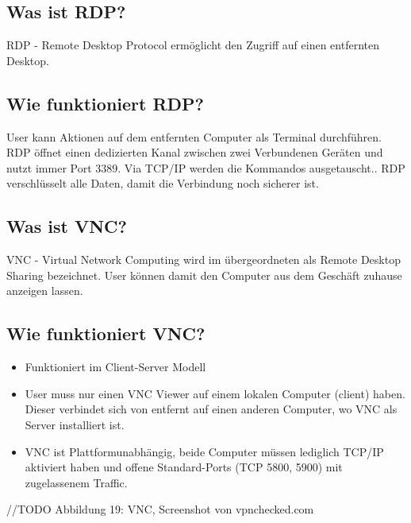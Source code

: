 \subsection*{Was ist RDP?}
RDP - Remote Desktop Protocol ermöglicht den Zugriff auf einen entfernten Desktop.

\subsection*{Wie funktioniert RDP?}
User kann Aktionen auf dem entfernten Computer als Terminal durchführen. RDP öffnet einen dedizierten Kanal zwischen zwei Verbundenen Geräten und nutzt immer Port 3389. Via TCP/IP werden die Kommandos ausgetauscht.. RDP verschlüsselt alle Daten, damit die Verbindung noch sicherer ist.

\subsection*{Was ist VNC?}
VNC - Virtual Network Computing wird im übergeordneten als Remote Desktop Sharing bezeichnet. User können damit den Computer aus dem Geschäft zuhause anzeigen lassen.

\subsection*{Wie funktioniert VNC?}
\begin{itemize}
    \item Funktioniert im Client-Server Modell
    \item User muss nur einen VNC Viewer auf einem lokalen Computer (client) haben. Dieser verbindet sich von entfernt auf einen anderen Computer, wo VNC als Server installiert ist.
    \item VNC ist Plattformunabhängig, beide Computer müssen lediglich TCP/IP aktiviert haben und offene Standard-Ports (TCP 5800, 5900) mit zugelassenem Traffic.
\end{itemize}
//TODO Abbildung 19: VNC, Screenshot von vpnchecked.com

